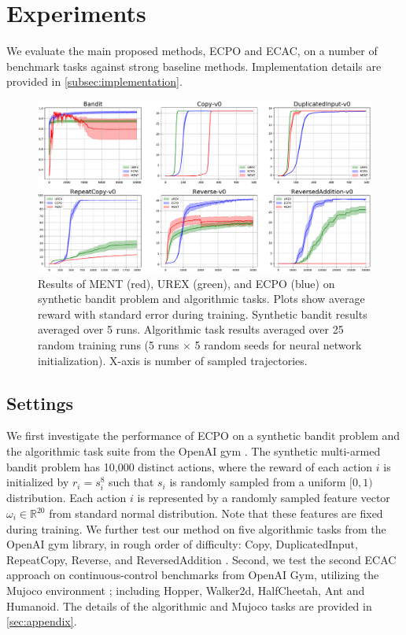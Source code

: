 
\section{Experiments}
\label{sec:experiments}

We evaluate the main proposed methods, ECPO and ECAC,
on a number of benchmark tasks against strong baseline methods.
Implementation details are provided in \cref{subsec:implementation}. 

\begin{figure}[t]
\begin{center}
\includegraphics[width=0.7\linewidth]{./bandit_algorithmic_results.pdf}
\end{center}
\caption{
Results of MENT (red), UREX (green), and ECPO (blue) on synthetic bandit
problem and algorithmic tasks.
Plots show average reward with standard error during training.
Synthetic bandit results averaged over 5 runs.
Algorithmic task results averaged over 25 random training runs
(5 runs $\times$ 5 random seeds for neural network initialization).
X-axis is number of sampled trajectories.
} 
\label{fig:results}
\end{figure}

\subsection{Settings}
\label{subsec:tasks}

We first investigate the performance of ECPO on a synthetic bandit problem
and the algorithmic task suite from the OpenAI gym \citep{brockman2016openai}.
The synthetic multi-armed bandit problem has 10,000 distinct actions,
where
the reward of each action $i$ is initialized by $r_i = s_i^{8}$
such that $s_i$ is randomly sampled from a uniform $[0,1)$ distribution.
Each action $i$ is represented by a randomly sampled feature vector
$\omega_i\in \mathbb{R}^{20}$ from standard normal distribution.
Note that these features are fixed during training.
We further test our method on five algorithmic tasks from the OpenAI gym
library, in rough order of difficulty:
Copy, DuplicatedInput, RepeatCopy, Reverse, and ReversedAddition
\citep{brockman2016openai}.
%
Second, we test the second ECAC approach on continuous-control benchmarks
from OpenAI Gym, utilizing the Mujoco environment
\citep{brockman2016openai,todorov2012mujoco};
including Hopper, Walker2d, HalfCheetah, Ant and Humanoid.
The details of the algorithmic and Mujoco tasks are provided in \cref{sec:appendix}.

